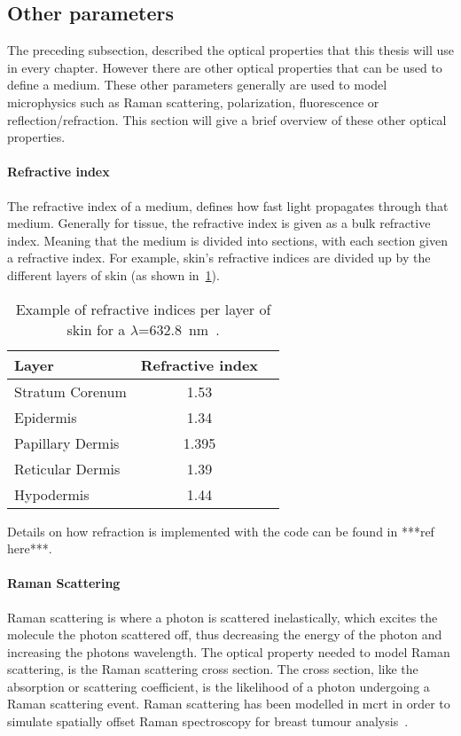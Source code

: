 \subsection{Other parameters}\label{sec:other}
The preceding subsection, described the optical properties that this thesis will use in every chapter. However there are other optical properties that can be used to define a medium. These other parameters generally are used to model microphysics such as Raman scattering, polarization, fluorescence or reflection/refraction. This section will give a brief overview of these other optical properties.

\medskip

\paragraph*{Refractive index}
The refractive index of a medium, defines how fast light propagates through that medium. Generally for tissue, the refractive index is given as a bulk refractive index. Meaning that the medium is divided into sections, with each section given a refractive index. For example, skin's refractive indices are divided up by the different layers of skin (as shown in~\cref{tab:refrac}).

\begin{table}[hb!]
	\centering

	\begin{tabular}{|l|cc|}
	\hline

	\hline
	\textbf{Layer} & \textbf{Refractive index} &\\
	\hline

	\hline
		Stratum Corenum & 1.53 & \\
	\hline
		Epidermis & 1.34 & \\
	\hline
		Papillary Dermis & 1.395 &\\
	\hline
		Reticular Dermis & 1.39 &\\
	\hline
		Hypodermis & 1.44 &\\
	\hline

	\hline
	\end{tabular}
	\caption{Example of refractive indices per layer of skin for a $\lambda$=632.8~nm~\cite{meglinski2002quantitative}.}
	\label{tab:refrac}
\end{table}

Details on how refraction is implemented with the code can  be found in ***ref here***.

\medskip

\paragraph*{Raman Scattering}
Raman scattering is where a photon is scattered inelastically, which excites the molecule the photon scattered off, thus decreasing the energy of the photon and increasing the photons wavelength. The optical property needed to model Raman scattering, is the Raman scattering cross section. The cross section, like the absorption or scattering coefficient, is the likelihood of a photon undergoing a Raman scattering event. Raman scattering has been modelled in \gls{mcrt} in order to simulate spatially offset Raman spectroscopy for breast tumour analysis~\cite{keller2010monte}.

